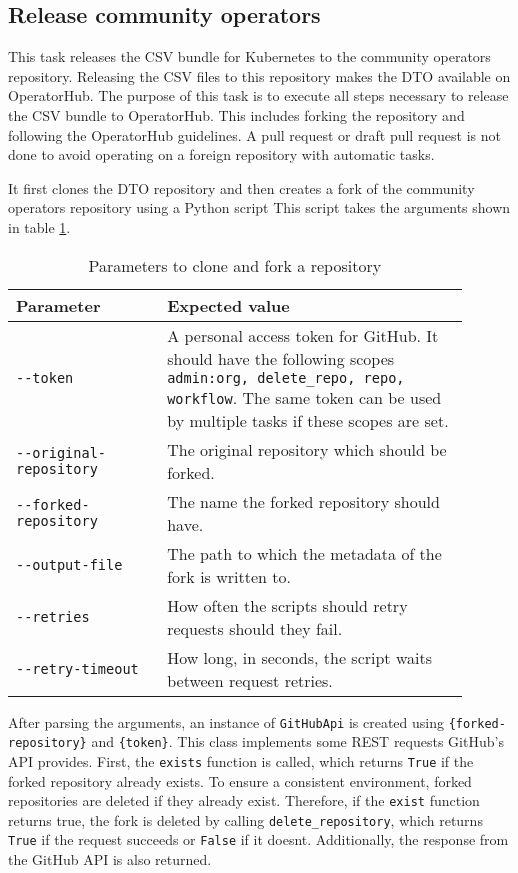 \subsection{Release community operators}\label{subsec:release-community-operators}

This task releases the CSV bundle for Kubernetes to the community operators repository.
Releasing the CSV files to this repository makes the DTO available on OperatorHub.
The purpose of this task is to execute all steps necessary to release the CSV bundle to OperatorHub.
This includes forking the repository and following the OperatorHub guidelines.
A pull request or draft pull request is not done to avoid operating on a foreign repository with automatic tasks.

It first clones the DTO repository and then creates a fork of the community operators repository using a Python script
This script takes the arguments shown in table \ref{tab:parameters-to-clone-and-fork-a-repository}.

\begin{table}[h]
    \centering
    \caption{Parameters to clone and fork a repository}
    \label{tab:parameters-to-clone-and-fork-a-repository}
    \begin{tabular}{p{0.3\linewidth}|p{0.6\linewidth}}
        Parameter & Expected value \\
        \hline
        \verb|--token| & A personal access token for GitHub.
            It should have the following scopes \verb|admin:org, delete_repo, repo, workflow|.
            The same token can be used by multiple tasks if these scopes are set. \\
        \verb|--original-repository| & The original repository which should be forked. \\
        \verb|--forked-repository| & The name the forked repository should have. \\
        \verb|--output-file| & The path to which the metadata of the fork is written to. \\
        \verb|--retries| & How often the scripts should retry requests should they fail. \\
        \verb|--retry-timeout| & How long, in seconds, the script waits between request retries. \\
    \end{tabular}
\end{table}

After parsing the arguments, an instance of \verb|GitHubApi| is created using \verb|{forked-repository}| and \verb|{token}|.
This class implements some REST requests GitHub's API provides.
First, the \verb|exists| function is called, which returns \verb|True| if the forked repository already exists.
To ensure a consistent environment, forked repositories are deleted if they already exist.
Therefore, if the \verb|exist| function returns true, the fork is deleted by calling \verb|delete_repository|, which returns \verb|True| if the request succeeds or \verb|False| if it doesnt.
Additionally, the response from the GitHub API is also returned.

